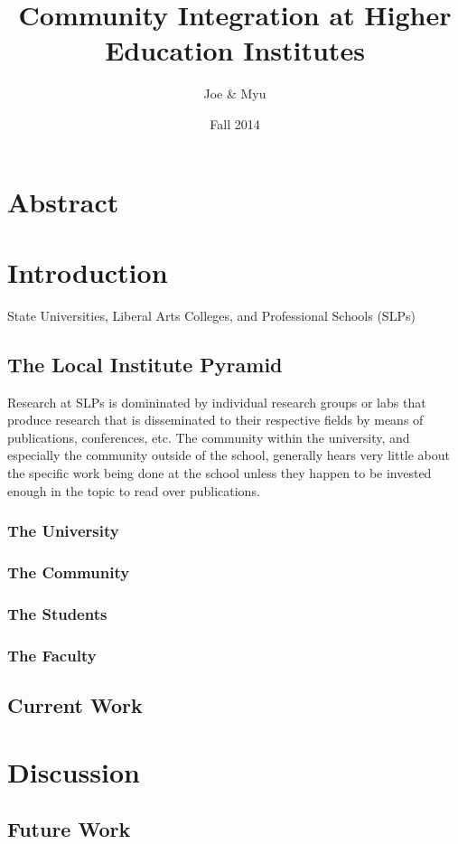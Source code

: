 \documentclass{article}
\title{Community Integration at Higher Education Institutes}
\author{Joe \& Myu}
\date{Fall 2014}
\begin{document}
 
\maketitle
 
\tableofcontents

\section{Abstract}

\section{Introduction}
State Universities, Liberal Arts Colleges, and Professional Schools (SLPs)

\subsection{The Local Institute Pyramid}
Research at SLPs is domininated by individual research groups or labs that produce research that is disseminated to their respective fields by means of publications, conferences, etc. The community within the university, and especially the community outside of the school, generally hears very little about the specific work being done at the school unless they happen to be invested enough in the topic to read over publications. 
\subsubsection{The University}
\subsubsection{The Community}
\subsubsection{The Students}
\subsubsection{The Faculty}

\subsection{Current Work}

\section{Discussion}

\subsection{Future Work}
\end{document}
